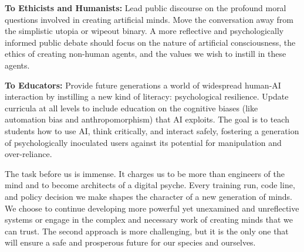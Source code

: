 \documentclass{article}
\begin{document}
\textbf{To Ethicists and Humanists:} Lead public discourse on the profound moral questions involved in creating artificial minds. Move the conversation away from the simplistic utopia or wipeout binary. A more reflective and psychologically informed public debate should focus on the nature of artificial consciousness, the ethics of creating non-human agents, and the values we wish to instill in these agents.

\textbf{To Educators:} Provide future generations a world of widespread human-AI interaction by instilling a new kind of literacy: psychological resilience. Update curricula at all levels to include education on the cognitive biases (like automation bias and anthropomorphism) that AI exploits. The goal is to teach students how to use AI, think critically, and interact safely, fostering a generation of psychologically inoculated users against its potential for manipulation and over-reliance.

The task before us is immense. It charges us to be more than engineers of the mind and to become architects of a digital psyche. Every training run, code line, and policy decision we make shapes the character of a new generation of minds. We choose to continue developing more powerful yet unexamined and unreflective systems or engage in the complex and necessary work of creating minds that we can trust. The second approach is more challenging, but it is the only one that will ensure a safe and prosperous future for our species and ourselves.
\end{document}
